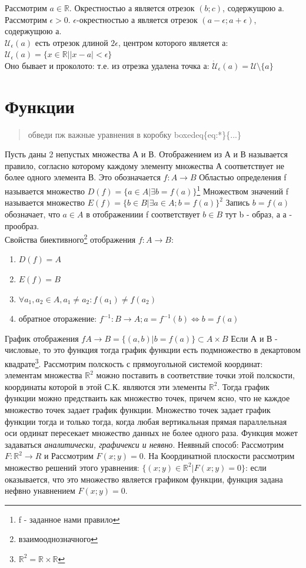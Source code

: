 \documentclass[oneside]{book}
\begin{document}
Рассмотрим $a \in \mathbb{R}$. Окрестностью а является отрезок $(b; c)$, содержущюю а.
Рассмотрим $\epsilon > 0$. $\epsilon$-окрестностью а является отрезок $(a-\epsilon; a+\epsilon)$, содержущюю а.\\
$\mathcal{U}_\epsilon(a)$ есть отрезок длиной  $2\epsilon$, центром которого является а: \\
$\mathcal{U}_\epsilon(a) = \{x \in \mathbb{R} | |x-a|< \epsilon\}$\\
Оно бывает и проколото: т.е. из отрезка удалена точка а: $\dot{\mathcal{U}}_\epsilon(a) = \mathcal{U} \setminus \{a\}$

\setcounter{chapter}{1}
\chapter{Функции}
\begin{quote}
    обведи пж важные уравнения в коробку boxedeq\{eq:*\}\{...\}
\end{quote}

Пусть даны 2 непустых множества А и В. Отображением из А и В называется правило, согласно которому каждому элементу
множества А соответствует не более одного элемента В. Это обозначается $f : A \rightarrow B$
Областью определения f называется множество $D(f) = \{a \in A | \exists b = f(a)\}$\footnote{f - заданное нами правило}
Множеством значений f называется множество $E(f) = \{b \in B | \exists a \in A; b = f(a)\}^2$ Запись
$b = f(a)$ обозначает, что $a \in A$ в отображениии f соответствует $b \in B$ тут b - образ, а а - прообраз. \\
Свойства биективного\footnote{взаимооднозначного} отображения $f: A \rightarrow B$:
\begin{enumerate}
    \item $D(f) = A$
    \item $E(f) = B$
    \item $\forall a_1, a_2 \in A, a_1 \neq a_2: f(a_1) \neq f(a_2)$
    \item обратное оторажение: $f^{-1}: B \rightarrow A; a = f^{-1}(b) \Leftrightarrow b = f(a)$
\end{enumerate}
График отображения $f A \rightarrow B = \{(a, b) | b = f(a)\} \subset A \times B$ Если А и В - числовые, то это функция тогда
график функции есть подмножество в декартовом квадрате\footnote{$\mathbb{R}^2 = \mathbb{R} \times \mathbb{R}$}.
Рассмотрим полскость с прямоугольной системой координат: элементам множества $\mathbb{R}^2$ можно поставить в соответствие
точки этой полскости, координаты которой в этой С.К. являются  эти элементы $\mathbb{R}^2$. Тогда график функции можно предстваить как
множество точек, причем ясно, что не каждое множество точек задает график функции. Множество точек задает график функции тогда и только
тогда, когда любая вертикальная прямая параллельная оси ординат пересекает множество данных не более одного раза. Функция может задаваться
\textit{аналитически, графичекси и неявно}. Неявный способ: Рассмотрим $F : \mathbb{R}^2 \rightarrow R$ и Рассмотрим $F(x;y) = 0$.
На Координатной плоскости рассмотрим множество решений этого уравнения: $\{(x;y) \in \mathbb{R}^2 | F(x;y) = 0\}$: если оказывается, что
это множество является графиком функции, функция задана нефвно унавнением $F(x;y) = 0$.
\end{document}
